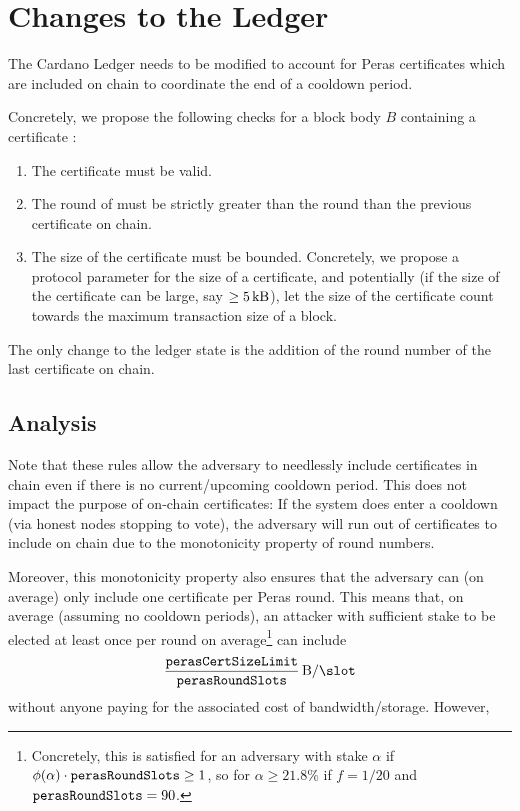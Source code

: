 \section{Changes to the Ledger}

The Cardano Ledger \parencite{shelley-ledger-specs,cardano-formal-ledger-specs} needs to be modified to account for Peras certificates which are included on chain to coordinate the end of a cooldown period.

Concretely, we propose the following checks for a block body $B$ containing a certificate \cert{}:
\begin{enumerate}
\item
  The certificate \cert{} must be valid.
\item
  The round of \cert{} must be strictly greater than the round than the previous certificate on chain.
\item
  The size of the certificate must be bounded.
  Concretely, we propose a protocol parameter \perasCertSizeLimit{} for the size of a certificate, and potentially (if the size of the certificate can be large, say $\ge\SI{5}{\kilo\byte}$), let the size of the certificate count towards the maximum transaction size of a block.
\end{enumerate}
The only change to the ledger state is the addition of the round number of the last certificate on chain.

\subsection{Analysis}
Note that these rules allow the adversary to needlessly include certificates in chain even if there is no current/upcoming cooldown period.
This does not impact the purpose of on-chain certificates:
If the system does enter a cooldown (via honest nodes stopping to vote), the adversary will run out of certificates to include on chain due to the monotonicity property of round numbers.

Moreover, this monotonicity property also ensures that the adversary can (on average) only include one certificate per Peras round.
This means that, on average (assuming no cooldown periods), an attacker with sufficient stake to be elected at least once per round on average\footnote{Concretely, this is satisfied for an adversary with stake $\alpha$ if $\phi(\alpha)\cdot\mathtt{perasRoundSlots} \ge 1$, so for $\alpha \ge 21.8\%$ if $f=1/20$ and $\mathtt{perasRoundSlots}=90$.} can include
\[\frac \perasCertSizeLimit \perasRoundSlots\,\unit{B/\slot}\]
without anyone paying for the associated cost of bandwidth/storage.
However,

